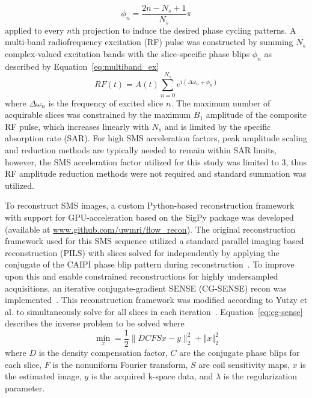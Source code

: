 \begin{equation}
    \phi_n = \frac{2n-N_s+1}{N_s}\pi
    \label{eq:caipi_blips}
\end{equation}
applied to every $n$th projection to induce the desired phase cycling patterns. A multi-band radiofrequency excitation (RF) pulse was constructed by summing $N_s$ complex-valued excitation bands with the slice-specific phase blips $\phi_n$ as described by Equation~\ref{eq:multiband_ex} 
\begin{equation}
    RF(t) = A(t) \sum_{n=0}^{N_s} e^{i(\Delta \omega_n + \phi_n)} 
    \label{eq:multiband_ex}
\end{equation}
where $\Delta \omega_n$ is the frequency of excited slice $n$. 
The maximum number of acquirable slices was constrained by the maximum $B_1$ amplitude of the composite RF pulse, which increases linearly with $N_s$ and is limited by the specific absorption rate (SAR). For high SMS acceleration factors, peak amplitude scaling and reduction methods are typically needed to remain within SAR limits, however, the SMS acceleration factor utilized for this study was limited to 3, thus RF amplitude reduction methods were not required and standard summation was utilized.

To reconstruct SMS images, a custom Python-based reconstruction framework with support for GPU-acceleration based on the SigPy package was developed (available at \url{www.github.com/uwmri/flow_recon}). The original reconstruction framework used for this SMS sequence utilized a standard parallel imaging based reconstruction (PILS) with slices solved for independently by applying the conjugate of the CAIPI phase blip pattern during reconstruction~\cite{griswoldPartiallyParallelImaging2000}. To improve upon this and enable constrained reconstructions for highly undersampled acquisitions, an iterative conjugate-gradient SENSE (CG-SENSE) recon was implemented~\cite{pruessmann2001}. This reconstruction framework was modified according to Yutzy et al\@. to simultaneously solve for all slices in each iteration~\cite{yutzyImprovementsMultisliceParallel2011a}. Equation~\ref{eq:cg-sense} describes the inverse problem to be solved where  
\begin{equation}
    \min_x = \frac{1}{2} \lVert DCFSx - y \rVert_2^2 + \left\Vert x \right\Vert_2^2
    \label{eq:cg-sense}
\end{equation}
where $D$ is the density compensation factor, $C$ are the conjugate phase blips for each slice, $F$ is the nonuniform Fourier transform, $S$ are coil sensitivity maps, $x$ is the estimated image, $y$ is the acquired k-space data, and $\lambda$ is the regularization parameter. 


